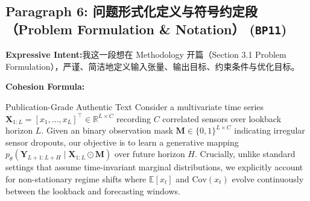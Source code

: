 \subsection*{Paragraph 6: 问题形式化定义与符号约定段（Problem Formulation \& Notation） (\texttt{BP11})}
\noindent\textbf{Expressive Intent:}\enspace 我这一段想在 Methodology 开篇（Section 3.1 Problem Formulation），严谨、简洁地定义输入张量、输出目标、约束条件与优化目标。\par
\noindent\textbf{Cohesion Formula:}\par\vspace{4pt}
\begin{ExampleBox}{Publication-Grade Authentic Text}
Consider a multivariate time series $\mathbf{X}_{1:L} = [x_1, \dots, x_L]^\top \in \mathbb{R}^{L \times C}$ recording $C$ correlated sensors over lookback horizon $L$. Given an binary observation mask $\mathbf{M} \in \{0, 1\}^{L \times C}$ indicating irregular sensor dropouts, our objective is to learn a generative mapping $p_\theta(\mathbf{Y}_{L+1:L+H} \mid \mathbf{X}_{1:L} \odot \mathbf{M})$ over future horizon $H$. Crucially, unlike standard settings that assume time-invariant marginal distributions, we explicitly account for non-stationary regime shifts where $\mathbb{E}[x_t]$ and $\text{Cov}(x_t)$ evolve continuously between the lookback and forecasting windows.
\end{ExampleBox}
